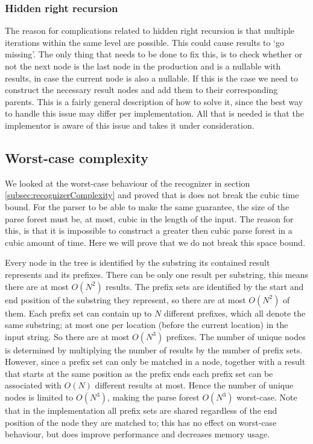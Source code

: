 \documentclass[a4paper,10pt]{article}
\begin{document}
\subsubsection{Hidden right recursion}
The reason for complications related to hidden right recursion is that multiple iterations within the same level are possible. This could cause results to `go missing'. The only thing that needs to be done to fix this, is to check whether or not the next node is the last node in the production and is a nullable with results, in case the current node is also a nullable. If this is the case we need to construct the necessary result nodes and add them to their corresponding parents. This is a fairly general description of how to solve it, since the best way to handle this issue may differ per implementation. All that is needed is that the implementor is aware of this issue and takes it under consideration.

\subsection{Worst-case complexity}
We looked at the worst-case behaviour of the recognizer in section \ref{subsec:recognizerComplexity} and proved that is does not break the cubic time bound. For the parser to be able to make the same guarantee, the size of the parse forest must be, at most, cubic in the length of the input. The reason for this, is that it is impossible to construct a greater then cubic parse forest in a cubic amount of time. Here we will prove that we do not break this space bound.

Every node in the tree is identified by the substring its contained result represents and its prefixes. There can be only one result per substring, this means there are at most $O(N^2)$ results. The prefix sets are identified by the start and end position of the substring they represent, so there are at most $O(N^2)$ of them. Each prefix set can contain up to $N$ different prefixes, which all denote the same substring; at most one per location (before the current location) in the input string. So there are at most $O(N^3)$ prefixes. The number of unique nodes is determined by multiplying the number of results by the number of prefix sets. However, since a prefix set can only be matched in a node, together with a result that starts at the same position as the prefix ends each prefix set can be associated with $O(N)$ different results at most. Hence the number of unique nodes is limited to $O(N^3)$, making the parse forest $O(N^3)$ worst-case. Note that in the implementation all prefix sets are shared regardless of the end position of the node they are matched to; this has no effect on worst-case behaviour, but does improve performance and decreases memory usage.
\end{document}
